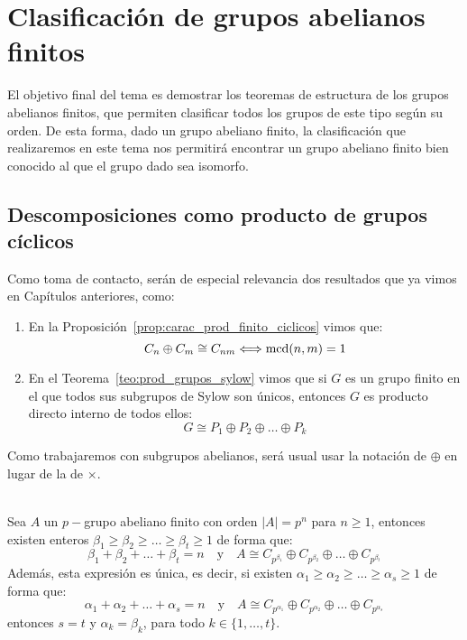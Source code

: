\chapter{Clasificación de grupos abelianos finitos}
\noindent
El objetivo final del tema es demostrar los teoremas de estructura de los grupos abelianos finitos, que permiten clasificar todos los grupos de este tipo según su orden. De esta forma, dado un grupo abeliano finito, la clasificación que realizaremos en este tema nos permitirá encontrar un grupo abeliano finito bien conocido al que el grupo dado sea isomorfo.

\section{Descomposiciones como producto de grupos cíclicos}
\noindent
Como toma de contacto, serán de especial relevancia dos resultados que ya vimos en Capítulos anteriores, como:

\begin{enumerate}
    \item En la Proposición~\ref{prop:carac_prod_finito_ciclicos} vimos que:
        \begin{equation*}
            C_n\oplus C_m \cong C_{nm} \Longleftrightarrow \operatorname{mcd}(n,m) = 1
        \end{equation*}
    \item En el Teorema~\ref{teo:prod_grupos_sylow} vimos que si $G$ es un grupo finito en el que todos sus subgrupos de Sylow son únicos, entonces $G$ es producto directo interno de todos ellos:
        \begin{equation*}
            G \cong P_1\oplus P_2 \oplus \ldots \oplus P_k
        \end{equation*}
\end{enumerate}
Como trabajaremos con subgrupos abelianos, será usual usar la notación de $\oplus$ en lugar de la de $\times$.

\begin{teo}\label{teo:1_tema6}\ \\
    Sea $A$ un $p-$grupo abeliano finito con orden $|A| = p^n$ para $n\geq 1$, entonces existen enteros $\beta_1\geq \beta_2 \geq \ldots \geq \beta_t \geq 1$ de forma que:
    \begin{equation*}
        \beta_1 + \beta_2 + \ldots + \beta_t = n \quad \text{y} \quad A\cong C_{p^{\beta_1}} \oplus C_{p^{\beta_2}} \oplus \ldots \oplus C_{p^{\beta_t}}
    \end{equation*}
    Además, esta expresión es única, es decir, si existen $\alpha_1\geq \alpha_2\geq \ldots \geq \alpha_s \geq 1$ de forma que:
    \begin{equation*}
        \alpha_1 + \alpha_2 + \ldots + \alpha_s = n \quad \text{y} \quad A\cong C_{p^{\alpha_1}} \oplus C_{p^{\alpha_2}} \oplus \ldots \oplus C_{p^{\alpha_s}}
    \end{equation*}
    entonces $s = t$ y $\alpha_k = \beta_k$, para todo $k \in \{1,\ldots,t\}$.
\end{teo}

